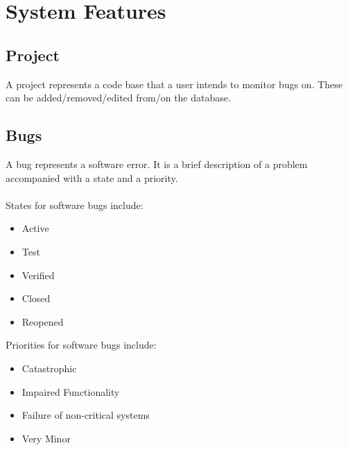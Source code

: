 \documentclass{article}
\newcommand{\comment}[1]{}
\begin{document}
\newpage
\section{System Features}\label{systemFeatures}
\comment{
E.g.

Description and Priority: 
<Provide a short description of the feature and indicate whether it is of High, Medium or Low Priority. You could also include specific priority component ratings, such as benefit, penalty, cost, and risk (each rated on a relative scale from low of 1 to high of 9)>

Stimulus/Response Sequences: 
<List the sequences of user actions and system responses that stimulate behaviour defined for this feature. These will correspond to the dialog elements associated with use cases.>

Functional Requirments:
< Itemize the detailed functional requirements associated with this feature. These are the software capabilites that must be present in order for the user to carry out the services provided by the feature, or to execute the use case. Include how the product should respond to anticipated error conditions or invalid inputs. Requirements should be concise, complete, unambigious, verifiable, and necessary. Use \acrshort{tbd} as a placeholder to indicate when necessary information is not yet available.>

<Each requirement should be uniquely identfied with a sequence number or a meaningful tab of some kind.>
	}
\subsection{Project}
A project represents a code base that a user intends to monitor bugs on. These can be added/removed/edited from/on the database. 
\subsection{Bugs}
A bug represents a software error. It is a brief description of a problem accompanied with a state and a priority.
\\ \\ 
States for software bugs include:
\begin{itemize}
\item Active
\item Test
\item Verified 
\item Closed 
\item Reopened
\end{itemize}
Priorities for software bugs include:
\begin{itemize}
\item Catastrophic 
\item Impaired Functionality 
\item Failure of non-critical systems 
\item Very Minor
\end{itemize}
\parencite{ibm20}
\end{document}
